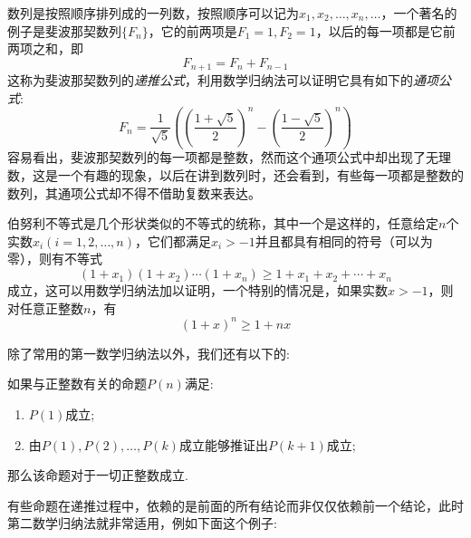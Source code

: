 \begin{example}
  数列是按照顺序排列成的一列数，按照顺序可以记为$x_1,x_2,\ldots,x_n,\ldots$，一个著名的例子是斐波那契数列$\{F_n\}$，它的前两项是$F_1=1,F_2=1$，以后的每一项都是它前两项之和，即
  \[ F_{n+1}=F_n+F_{n-1} \]
  这称为斐波那契数列的\emph{递推公式}，利用数学归纳法可以证明它具有如下的\emph{通项公式}:
  \[ F_n = \frac{1}{\sqrt{5}} \left( \left( \frac{1+\sqrt{5}}{2} \right)^n - \left( \frac{1-\sqrt{5}}{2} \right)^n \right) \]
  容易看出，斐波那契数列的每一项都是整数，然而这个通项公式中却出现了无理数，这是一个有趣的现象，以后在讲到数列时，还会看到，有些每一项都是整数的数列，其通项公式却不得不借助复数来表达。
\end{example}

\begin{example}
  伯努利不等式是几个形状类似的不等式的统称，其中一个是这样的，任意给定$n$个实数$x_i(i=1,2,\ldots,n)$，它们都满足$x_i>-1$并且都具有相同的符号（可以为零），则有不等式
  \[ (1+x_1)(1+x_2)\cdots(1+x_n) \geqslant 1+x_1+x_2+\cdots+x_n \]
  成立，这可以用数学归纳法加以证明，一个特别的情况是，如果实数$x>-1$，则对任意正整数$n$，有
  \[ (1+x)^n \geqslant 1+nx \]
\end{example}

除了常用的第一数学归纳法以外，我们还有以下的:
\begin{principle}[第二数学归纳法]
如果与正整数有关的命题$P(n)$满足:
  \begin{enumerate}
  \item $P(1)$成立;
  \item 由$P(1),P(2),\dots,P(k)$成立能够推证出$P(k+1)$成立;
  \end{enumerate}
那么该命题对于一切正整数成立.
\end{principle}
有些命题在递推过程中，依赖的是前面的所有结论而非仅仅依赖前一个结论，此时第二数学归纳法就非常适用，例如下面这个例子:

